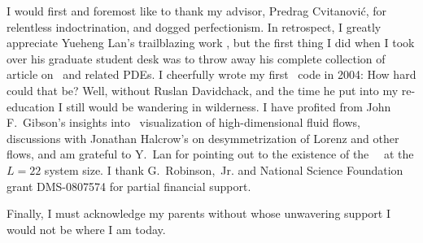 
I would first and foremost like to thank my advisor, Predrag Cvitanovi\'c,
for
	          {relentless indoctrination},
and dogged perfectionism.
In retrospect, I greatly appreciate Yueheng Lan's trailblazing
work%
              {, but the first thing I did when I took over his
graduate student desk was to throw away his complete collection of
article on \KS\  and related PDEs.
              }
I cheerfully wrote my first \KS\ code in 2004: How hard could
that be?
%
Well, without Ruslan Davidchack, and the time he put into my
re-education I still would be wandering in wilderness.
I have
profited from John F.~Gibson's insights into \statesp\
visualization of high-dimensional fluid flows,
discussions with
Jonathan Halcrow's on desymmetrization of Lorenz and other
flows,
and
am grateful to Y.~Lan for pointing out to the
existence of the ~\eqv\ at the $L=22$ system size.
I thank
G.~Robinson,~Jr. and National Science Foundation grant
DMS-0807574 for partial financial support.

Finally, I must acknowledge my parents without whose unwavering support
I would not be where I am today.
%

